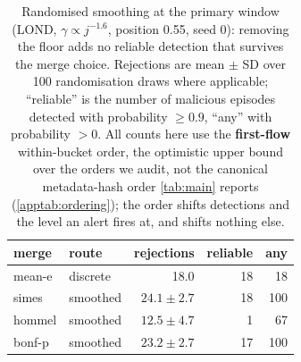 \begin{table}[t]
\centering
\caption{Randomised smoothing at the primary window (LOND, $\gamma\propto j^{-1.6}$,
position 0.55, seed 0): removing the floor adds no reliable detection that survives the
merge choice. Rejections are mean $\pm$ SD over 100 randomisation draws where applicable;
``reliable'' is the number of malicious episodes detected with probability $\ge 0.9$,
``any'' with probability $>0$. All counts here use the \textbf{first-flow} within-bucket order, the optimistic upper bound over the orders we audit, not the canonical metadata-hash order \cref{tab:main} reports (\cref{apptab:ordering}); the order shifts detections and the level an alert fires at, and shifts nothing else.}
\label{apptab:smoothing}
\begin{tabular}{llrrr}
\toprule
merge & route & rejections & reliable & any \\
\midrule
mean-e & discrete & 18.0 & 18 & 18 \\
simes & smoothed & $24.1\pm2.7$ & 18 & 100 \\
hommel & smoothed & $12.5\pm4.7$ & 1 & 67 \\
bonf-p & smoothed & $23.2\pm2.7$ & 17 & 100 \\
\bottomrule
\end{tabular}
\end{table}
